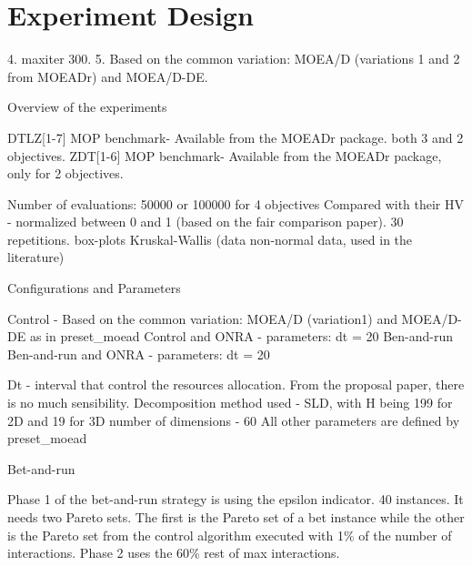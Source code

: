 \section{Experiment Design}

4. maxiter 300.
5. Based on the common variation: MOEA/D (variations 1 and 2 from MOEADr) and MOEA/D-DE.


Overview of the experiments

DTLZ[1-7] MOP benchmark- Available from the MOEADr package. both 3 and 2 objectives.
ZDT[1-6] MOP benchmark- Available from the MOEADr package, only for 2 objectives.

Number of evaluations: 50000 or 100000 for 4 objectives
Compared with their HV - normalized between 0 and 1 (based on the fair comparison paper).
30 repetitions.
box-plots 
Kruskal-Wallis (data non-normal data, used in the literature)

Configurations and Parameters

Control - Based on the common variation: MOEA/D (variation1) and MOEA/D-DE as in preset\_moead
Control and ONRA - parameters: dt = 20
Ben-and-run
Ben-and-run and ONRA - parameters: dt = 20

Dt - interval that control the resources allocation. From the proposal paper, there is no much sensibility.
Decomposition method used - SLD, with H being 199 for 2D and 19 for 3D 
number of dimensions - 60 
All other parameters are defined by  preset\_moead

Bet-and-run

Phase 1 of the bet-and-run strategy is using the epsilon indicator. 40 instances.
It needs two Pareto sets. The first is the Pareto set of a bet instance while the other is the Pareto set from the control algorithm executed with 1\% of the number of interactions. 
Phase 2 uses the 60\% rest of max interactions.